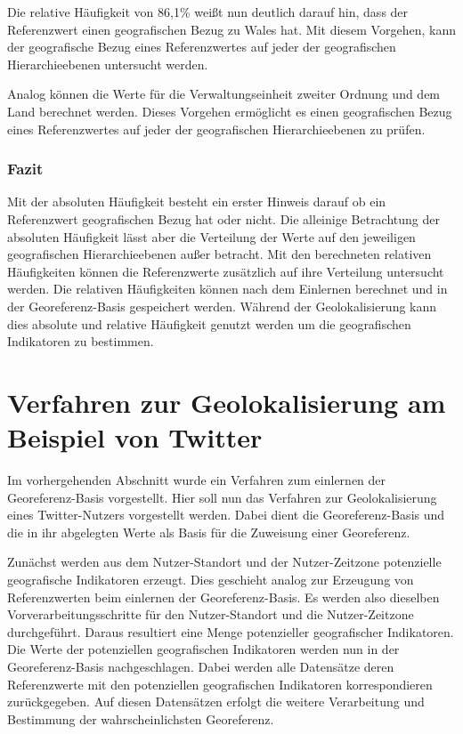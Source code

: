			Die relative Häufigkeit von 86,1\% weißt nun deutlich darauf hin, dass der Referenzwert einen geografischen Bezug zu Wales hat.
			Mit diesem Vorgehen, kann der geografische Bezug eines Referenzwertes auf jeder der geografischen Hierarchieebenen untersucht werden.

			Analog können die Werte für die Verwaltungseinheit zweiter Ordnung und dem Land berechnet werden.
			Dieses Vorgehen ermöglicht es einen geografischen Bezug eines Referenzwertes auf jeder der geografischen Hierarchieebenen zu prüfen.

		\subsubsection{Fazit}

			Mit der absoluten Häufigkeit besteht ein erster Hinweis darauf ob ein Referenzwert geografischen Bezug hat oder nicht.
			Die alleinige Betrachtung der absoluten Häufigkeit lässt aber die Verteilung der Werte auf den jeweiligen geografischen Hierarchieebenen außer betracht.
			Mit den berechneten relativen Häufigkeiten können die Referenzwerte zusätzlich auf ihre Verteilung untersucht werden.
			Die relativen Häufigkeiten können nach dem Einlernen berechnet und in der Georeferenz-Basis gespeichert werden. 
			Während der Geolokalisierung kann dies absolute und relative Häufigkeit genutzt werden um die geografischen Indikatoren zu bestimmen. 

	\section{Verfahren zur Geolokalisierung am Beispiel von Twitter}


		Im vorhergehenden Abschnitt wurde ein Verfahren zum einlernen der Georeferenz-Basis vorgestellt. 
		Hier soll nun das Verfahren zur Geolokalisierung eines Twitter-Nutzers vorgestellt werden.
		Dabei dient die Georeferenz-Basis und die in ihr abgelegten Werte als Basis für die Zuweisung einer Georeferenz.

		Zunächst werden aus dem Nutzer-Standort und der Nutzer-Zeitzone potenzielle geografische Indikatoren erzeugt.
		Dies geschieht analog zur Erzeugung von Referenzwerten beim einlernen der Georeferenz-Basis.
		Es werden also dieselben Vorverarbeitungsschritte für den Nutzer-Standort und die Nutzer-Zeitzone durchgeführt.
		Daraus resultiert eine Menge potenzieller geografischer Indikatoren.
		Die Werte der potenziellen geografischen Indikatoren werden nun in der Georeferenz-Basis nachgeschlagen. 
		Dabei werden alle Datensätze deren Referenzwerte mit den potenziellen geografischen Indikatoren korrespondieren zurückgegeben.
		Auf diesen Datensätzen erfolgt die weitere Verarbeitung und Bestimmung der wahrscheinlichsten Georeferenz.
		
